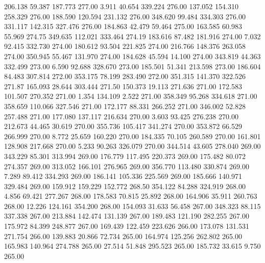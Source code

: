  206.138   59.387  187.773       277.00
   3.911   40.654  339.224       276.00
 137.052  154.310  258.329       276.00
 188.590  120.594  231.132       276.00
 348.620   99.484  334.303       276.00
 331.117  142.315  327.476       276.00
 184.863   42.479   59.464       275.00
 163.585   60.983   55.969       274.75
 349.635  112.021  333.464       274.19
 183.616   87.482  181.916       274.00
   7.032   92.415  332.730       274.00
 180.612   93.504  221.825       274.00
 216.766  148.376  263.058       274.00
 350.945   55.467  131.970       274.00
 184.628   45.594   14.100       274.00
 343.819   44.363  332.499       273.00
   6.590   92.688  328.670       273.00
 185.501   51.341  213.598       273.00
 186.604   84.483  307.814       272.00
 353.175   78.199  283.490       272.00
 351.315  141.370  322.526       271.87
 165.093   28.644  303.444       271.50
 150.373   19.113  271.636       271.00
 172.583  101.507  270.352       271.00
   1.354  134.109    2.522       271.00
 358.349   95.268  334.618       271.00
 358.659  110.066  327.546       271.00
 172.177   88.331  266.252       271.00
 346.002   52.828  257.488       271.00
 177.080  137.117  216.634       270.00
   3.603   93.425  276.238       270.00
 212.673   44.465   30.619       270.00
 355.736  105.417  341.274       270.00
 353.872   66.529  266.999       270.00
   8.772   25.659  160.220       270.00
 184.335   70.105  260.589       270.00
 161.801  128.908  217.668       270.00
   5.233   90.263  326.079       270.00
 344.514   43.605  278.040       269.00
 343.229   85.301  313.994       269.00
 176.779  117.495  220.373       269.00
 175.482   80.072  274.357       269.00
 313.052  166.101  276.965       269.00
 356.770  113.480  330.874       269.00
   7.289   89.412  334.293       269.00
 186.141  105.336  225.569       269.00
 185.666  140.971  329.484       269.00
 159.912  159.229  152.772       268.50
 354.122   84.288  324.919       268.00
   4.856   69.421  277.267       268.00
 178.583   70.815   25.892       268.00
 164.906   35.911  260.763       268.00
  12.226  124.161  354.200       268.00
 154.093   31.633   56.458       267.00
 348.323   88.115  337.338       267.00
 213.884  142.474  131.139       267.00
 189.483  121.190  282.255       267.00
 175.972   84.399  248.877       267.00
 169.439  122.459  223.626       266.00
 173.078  131.531  271.754       266.00
 139.883   20.866   72.734       265.00
 164.974  125.256  262.802       265.00
 165.983  140.964  274.788       265.00
  27.514   51.848  295.523       265.00
 185.732   33.615    9.750       265.00
